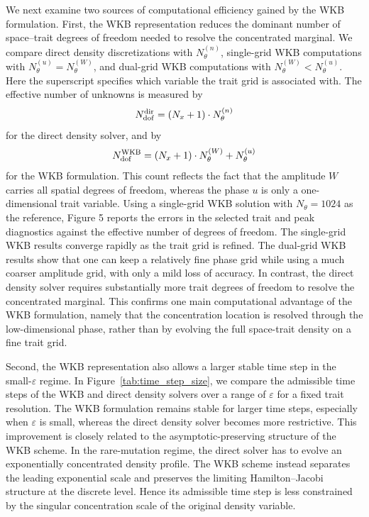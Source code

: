 \documentclass[11pt]{article}
\numberwithin{equation}{section}
\begin{document}


We next examine two sources of computational efficiency gained by the WKB formulation.  
First, the WKB representation reduces the
dominant number of space--trait degrees of freedom needed to resolve the
concentrated marginal.  
We compare direct density discretizations with \(N_\theta^{(n)}\), single-grid WKB computations with \(N_\theta^{(u)}=N_\theta^{(W)}\), and dual-grid WKB computations with \(N_\theta^{(W)}<N_\theta^{(u)}\). Here the superscript specifies which variable the trait grid is associated with. The effective number of unknowns is measured by 
\[ N_{\rm dof}^{\rm dir}=(N_x+1) \cdot N_\theta^{(n)} \]
 for the direct density solver, and by 
 \[ N_{\rm dof}^{\rm WKB}=(N_x+1)\cdot N_\theta^{(W)}+ N_\theta^{(u)} \]
  for the WKB formulation. 
This count reflects the fact that the amplitude \(W\) carries all spatial degrees of freedom, whereas the phase \(u\) is only a one-dimensional trait variable. Using a single-grid WKB solution with \(N_\theta=1024\) as the reference,
Figure 5 reports the errors in the selected trait and peak diagnostics against
the effective number of degrees of freedom. The single-grid WKB results converge rapidly as the trait grid is refined. The dual-grid WKB results show that one can keep a relatively fine phase grid while using a much coarser amplitude grid, with only a mild loss of accuracy. In contrast, the direct density solver requires substantially more trait degrees of freedom to resolve the concentrated marginal. This confirms one main computational advantage of the WKB formulation, namely that the concentration location is resolved through the low-dimensional phase, rather than by evolving the full space-trait density on a fine trait grid.


Second,  the WKB representation also allows a larger stable time step in the
small-$\varepsilon$ regime.
In Figure~\ref{tab:time_step_size},  we compare the admissible time steps of the WKB and
direct density solvers over a range of $\varepsilon$ for a
fixed trait resolution.  
The WKB formulation
remains stable for larger time steps, especially when $\varepsilon$ is small,
whereas the direct density solver becomes more restrictive.  
This improvement is closely related to the asymptotic-preserving structure of
the WKB scheme. 
In the rare-mutation regime, the direct solver has to evolve an exponentially
concentrated density profile.  The WKB scheme instead separates the leading
exponential scale and preserves the limiting Hamilton--Jacobi structure at the
discrete level.  Hence its admissible time step is less constrained by the
singular concentration scale of the original density variable.
\end{document}

